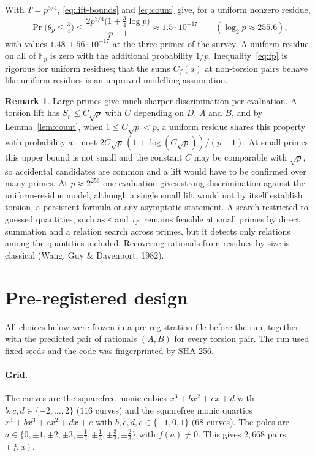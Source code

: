 \documentclass[11pt,a4paper]{article}
\numberwithin{equation}{section}
\theoremstyle{plain}
\theoremstyle{definition}
\newtheorem{remark}[theorem]{Remark}
\newcommand{\F}{\mathbb{F}}
\newcommand{\eps}{\varepsilon}
\begin{document}
With $T=p^{3/4}$, \eqref{eq:lift-bounds} and \eqref{eq:count} give, for a uniform nonzero residue,
\begin{equation}\label{eq:fp}
\Pr\bigl(\theta_p\le\tfrac34\bigr)\le\frac{2p^{3/4}\bigl(1+\tfrac34\log p\bigr)}{p-1}\approx1.5\cdot10^{-17}\qquad(\log_2p\approx255.6),
\end{equation}
with values $1.48$--$1.56\cdot10^{-17}$ at the three primes of the survey. A uniform residue on all of $\F_p$ is zero with the additional probability $1/p$. Inequality~\eqref{eq:fp} is rigorous for uniform residues; that the sums $C_f(a)$ at non-torsion pairs behave like uniform residues is an unproved modelling assumption.

\begin{remark}\label{rem:small}
Large primes give much sharper discrimination per evaluation. A torsion lift has $S_p\le C\sqrt p$ with $C$ depending on $D$, $A$ and $B$, and by Lemma~\ref{lem:count}, when $1\le C\sqrt p<p$, a uniform residue shares this property with probability at most $2C\sqrt p\,(1+\log(C\sqrt p))/(p-1)$. At small primes this upper bound is not small and the constant $C$ may be comparable with $\sqrt p$, so accidental candidates are common and a lift would have to be confirmed over many primes. At $p\approx2^{256}$ one evaluation gives strong discrimination against the uniform-residue model, although a single small lift would not by itself establish torsion, a persistent formula or any asymptotic statement. A search restricted to guessed quantities, such as $\eps$ and $\tau_f$, remains feasible at small primes by direct summation and a relation search across primes, but it detects only relations among the quantities included. Recovering rationals from residues by size is classical (Wang, Guy \& Davenport, 1982).
\end{remark}

\section{Pre-registered design}\label{sec:design}

All choices below were frozen in a pre-registration file before the run, together with the predicted pair of rationals $(A,B)$ for every torsion pair. The run used fixed seeds and the code was fingerprinted by SHA-256.

\paragraph{Grid.} The curves are the squarefree monic cubics $x^3+bx^2+cx+d$ with $b,c,d\in\{-2,\dots,2\}$ ($116$ curves) and the squarefree monic quartics $x^4+bx^3+cx^2+dx+e$ with $b,c,d,e\in\{-1,0,1\}$ ($68$ curves). The poles are $a\in\{0,\pm1,\pm2,\pm3,\pm\tfrac12,\pm\tfrac13,\pm\tfrac32,\pm\tfrac23\}$ with $f(a)\neq0$. This gives $2{,}668$ pairs $(f,a)$.
\end{document}
